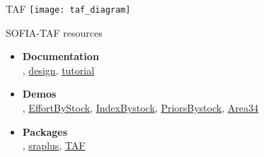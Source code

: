 \documentclass[aspectratio=169]{beamer}
\begin{document}

\begin{frame}{TAF}
  \centering
  \texttt{[image: taf\_diagram]}
\end{frame}


\begin{frame}[plain]
\end{frame}


\begin{frame}[plain]
\end{frame}


\begin{frame}{SOFIA-TAF resources}
  \begin{itemize}
    \item[] {\bf\darkgray Documentation}\\[0.5ex]
    ,
    {\blue\href{https://arni-magnusson.github.io/pdf/2022-sofia-taf.pdf}{design}},
    {\blue\href{https://github.com/sofia-taf/doc/blob/main/sofia_taf_tutorial.md}{tutorial}}\\[5ex]
    \item[] {\bf\darkgray Demos}\\[0.5ex]
    ,
    {\blue\href{https://github.com/sofia-taf/WorkshopEffortByStock}{EffortByStock}},
    {\blue\href{https://github.com/sofia-taf/WorkshopIndexByStock}{IndexBystock}},
    {\blue\href{https://github.com/sofia-taf/WorkshopPriorsByStock}{PriorsBystock}},
    {\blue\href{https://github.com/sofia-taf/2023Area34GlobalEffortFishstatstocks}{Area34}}\\[5ex]
    \item[] {\bf\darkgray Packages}\\[0.5ex]
    ,
    {\blue\href{https://github.com/DanOvando/sraplus}{sraplus}},
    {\blue\href{https://github.com/ices-tools-prod/TAF}{TAF}}
  \end{itemize}
\end{frame}
\end{document}
